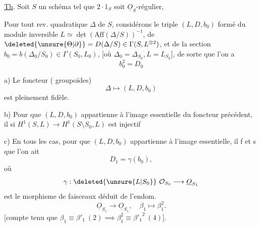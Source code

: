 \uline{Th}.  Soit $S$ un schéma tel que $2\cdot1_S$ soit $\underline O_S$-régulier,  

Pour tout rev. quadratique $\Delta$ de $S$, considérons le triple $(L,D,b_0)$ formé du module inversible $L\simeq\underline{\det}(\underline{\mathrm{Aff}}(\Delta/S))^{-1}$, de $\deleted{\unsure{\Theta|\partial}}=D(\Delta/S)\in\Gamma(S,L^{\otimes2})$, et de la section $b_0=b(\Delta_0/S_0)\in\Gamma(S_0,L_0)$, [où $\Delta_0=\Delta_{S_0},L=L_{S_0}$], de sorte que l'on a
\[b_0^2=D_0\tag*{(8.1)}\]

a) Le foncteur (  groupoïdes)
\[\Delta\longmapsto(L,D,b_0)\]
est pleinement fidèle.

b)  Pour que  $(L,D,b_0)$ appartienne à l'image essentielle du foncteur précédent, il   si $H^1(S,L)\longrightarrow H^1(S\setminus S_0,L)$ est injectif   

c) En tous les cas, pour que $(L,D,b_0)$ appartienne à l'image essentielle, il f et s que l'on ait
\[D_1=\gamma(b_0),\]
où
\[\gamma:\deleted{\unsure{L|S_0}}\ \mathcal O_{S_0}\longrightarrow\underline O_{S_1}\]
est le morphisme de faisceaux  déduit de l'endom.
\[\underline O_{S_1}\longrightarrow\underline O_{S_1},\quad\beta_1\longmapsto\beta_1^2.\]
[compte tenu que $\beta_1\equiv\beta'_1\ (2)\implies\beta_1^2\equiv{\beta'_1}^2\ (4)$].


